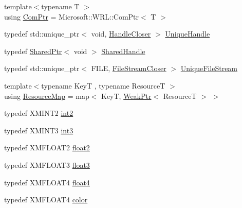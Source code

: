\begin{DoxyCompactItemize}
\item 
{\footnotesize template$<$typename T $>$ }\\using \hyperlink{namespacemage_ae74f374780900893caa5555d1031fd79}{Com\+Ptr} = Microsoft\+::\+W\+R\+L\+::\+Com\+Ptr$<$ T $>$
\item 
typedef std\+::unique\+\_\+ptr$<$ void, \hyperlink{structmage_1_1_handle_closer}{Handle\+Closer} $>$ \hyperlink{namespacemage_a284e84e551a05d4fc6c957985b2de3ed}{Unique\+Handle}
\item 
typedef \hyperlink{namespacemage_a1e01ae66713838a7a67d30e44c67703e}{Shared\+Ptr}$<$ void $>$ \hyperlink{namespacemage_ab892828913d6129acf71e0cec60467e5}{Shared\+Handle}
\item 
typedef std\+::unique\+\_\+ptr$<$ F\+I\+LE, \hyperlink{structmage_1_1_file_stream_closer}{File\+Stream\+Closer} $>$ \hyperlink{namespacemage_a679c1b707dee02c7eab8d706ef14411a}{Unique\+File\+Stream}
\item 
{\footnotesize template$<$typename KeyT , typename ResourceT $>$ }\\using \hyperlink{namespacemage_a0b0a087ad59dd4aa0b4b538d8caec216}{Resource\+Map} = map$<$ KeyT, \hyperlink{namespacemage_aa159a63c0d58464bdf32dfe419dd5dc1}{Weak\+Ptr}$<$ ResourceT $>$ $>$
\item 
typedef X\+M\+I\+N\+T2 \hyperlink{namespacemage_aa22600b49377872988582e782d7b1fcd}{int2}
\item 
typedef X\+M\+I\+N\+T3 \hyperlink{namespacemage_a80c7f9de83dfbbd55bbf339dbcbd99cc}{int3}
\item 
typedef X\+M\+F\+L\+O\+A\+T2 \hyperlink{namespacemage_a536f5856288c280080c9cdf739e85ddc}{float2}
\item 
typedef X\+M\+F\+L\+O\+A\+T3 \hyperlink{namespacemage_aab5dae4b0aaf8129b9e0d651d91d4b38}{float3}
\item 
typedef X\+M\+F\+L\+O\+A\+T4 \hyperlink{namespacemage_aa79484ea5211c29727b3794199ac0a55}{float4}
\item 
typedef X\+M\+F\+L\+O\+A\+T4 \hyperlink{namespacemage_a56eceea5a9bceb2b56073f3ea4945781}{color}
\end{DoxyCompactItemize}
